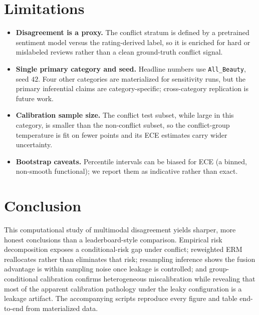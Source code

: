\documentclass[11pt,a4paper]{article}
\begin{document}
\section{Limitations}
\label{sec:limitations}

\begin{itemize}[leftmargin=*,nosep]
  \item \textbf{Disagreement is a proxy.} The conflict stratum is defined by a
        pretrained sentiment model versus the rating-derived label, so it is
        enriched for hard or mislabeled reviews rather than a clean
        ground-truth conflict signal.
  \item \textbf{Single primary category and seed.} Headline numbers use
        \texttt{All\_Beauty}, seed $42$. Four other categories are materialized
        for sensitivity runs, but the primary inferential claims are
        category-specific; cross-category replication is future work.
  \item \textbf{Calibration sample size.} The conflict test subset, while large
        in this category, is smaller than the non-conflict subset, so the
        conflict-group temperature is fit on fewer points and its ECE estimates
        carry wider uncertainty.
  \item \textbf{Bootstrap caveats.} Percentile intervals can be biased for ECE
        (a binned, non-smooth functional); we report them as indicative rather
        than exact.
\end{itemize}

\section{Conclusion}
\label{sec:conclusion}

This computational study of multimodal disagreement yields sharper, more honest
conclusions than a leaderboard-style comparison. Empirical risk
decomposition exposes a conditional-risk gap under conflict; reweighted ERM
reallocates rather than eliminates that risk; resampling inference shows the
fusion advantage is within sampling noise once leakage is controlled; and
group-conditional calibration confirms heterogeneous miscalibration while
revealing that most of the apparent calibration pathology under the leaky
configuration is a leakage artifact. The accompanying scripts reproduce every
figure and table end-to-end from materialized data.
\end{document}
